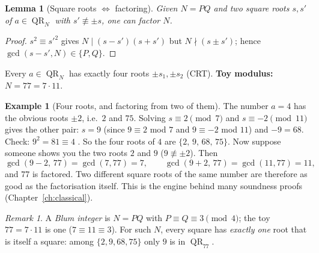 \documentclass[11pt,a4paper]{report}
\theoremstyle{plain}
\newtheorem{lemma}[theorem]{Lemma}
\theoremstyle{definition}
\newtheorem{example}[theorem]{Example}
\theoremstyle{remark}
\newtheorem{remark}[theorem]{Remark}
\DeclareMathOperator{\QR}{QR}\DeclareMathOperator{\QNR}{QNR}
\begin{document}
\begin{lemma}[Square roots $\Leftrightarrow$ factoring]\label{lem:sqrtfactor}
Given $N=PQ$ and two square roots $s,s'$ of $a\in\QR_N$ with $s'\not\equiv\pm s$, one can factor $N$.
\end{lemma}
\begin{proof}
$s^2\equiv s'^2$ gives $N\mid(s-s')(s+s')$ but $N\nmid(s\pm s')$; hence $\gcd(s-s',N)\in\{P,Q\}$.
\end{proof}
Every $a\in\QR_N$ has exactly four roots $\pm s_1,\pm s_2$ (CRT). \textbf{Toy modulus:} $N=77=7\cdot11$.
\begin{example}[Four roots, and factoring from two of them]\label{ex:fourroots}
The number $a=4$ has the obvious roots $\pm2$, i.e.\ $2$ and $75$. Solving $s\equiv2\pmod7$ and $s\equiv-2\pmod{11}$ gives the other pair: $s=9$ (since $9\equiv2$ mod $7$ and $9\equiv-2$ mod $11$) and $-9=68$. Check: $9^2=81\equiv4$ \checkmark. So the four roots of $4$ are $\{2,\,9,\,68,\,75\}$.
Now suppose someone shows you the two roots $2$ and $9$ ($9\not\equiv\pm2$). Then
\[\gcd(9-2,\,77)=\gcd(7,77)=7,\qquad\gcd(9+2,\,77)=\gcd(11,77)=11,\]
and $77$ is factored. Two different square roots of the same number are therefore as good as the factorisation itself. This is the engine behind many soundness proofs (Chapter~\ref{ch:classical}).
\end{example}
\begin{remark}
A \emph{Blum integer} is $N=PQ$ with $P\equiv Q\equiv3\pmod4$; the toy $77=7\cdot11$ is one ($7\equiv11\equiv3$). For such $N$, every square has \emph{exactly one} root that is itself a square: among $\{2,9,68,75\}$ only $9$ is in $\QR_{77}$.
\end{remark}
\end{document}
